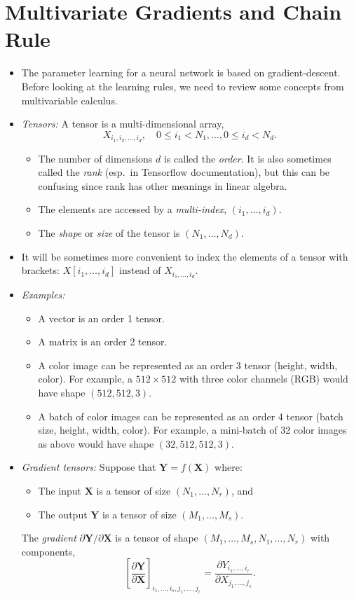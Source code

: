 \documentclass[11pt]{article}
\newcommand{\Xbf}{\mathbf{X}}
\newcommand{\Ybf}{\mathbf{Y}}
\begin{document}
\section{Multivariate Gradients and Chain Rule}

\begin{itemize}
\item The parameter learning for a neural network is based on gradient-descent.
Before looking at the learning rules, we need to review some concepts from
multivariable calculus.

\item \emph{Tensors:}  A tensor is a multi-dimensional array,
\[
    X_{i_1,i_2, \ldots, i_d}, \quad 0 \leq i_1 < N_1,\ldots,
    0 \leq i_d < N_d.
\]
\begin{itemize}
  \item The number of dimensions $d$ is called the \emph{order}.  It is also
  sometimes called the \emph{rank} (esp.\ in Tensorflow documentation), but this
  can be confusing since rank has other meanings in linear algebra.
  \item The elements are accessed by a \emph{multi-index}, $(i_1,\ldots,i_d)$.
  \item The \emph{shape} or \emph{size} of the tensor is $(N_1,\ldots,N_d)$.
\end{itemize}
\item It will be sometimes more convenient to index the elements of a tensor with brackets:
$X[i_1,\ldots,i_d]$ instead of $X_{i_1,\ldots,i_d}$.

\item \emph{Examples:}
\begin{itemize}
  \item A vector is an order 1 tensor.
  \item A matrix is an order 2 tensor.
  \item A color image can be represented as an order 3 tensor (height, width, color).
  For example, a $512 \times 512$ with three color channels (RGB) would have shape
  $(512,512,3)$.
  \item A batch of color images can be represented as an order 4 tensor 
  (batch size, height, width, color).  For example, a mini-batch of 32 color images
  as above would have shape $(32,512,512,3)$.  
\end{itemize}

\item \emph{Gradient tensors:}  Suppose that $\Ybf = f(\Xbf)$ where:
\begin{itemize}
  \item The input $\Xbf$ is a tensor of size $(N_1,\ldots,N_r)$, and
  \item The output $\Ybf$ is a tensor of size $(M_1,\ldots,M_s)$.
\end{itemize}
The \emph{gradient} $\partial \Ybf / \partial \Xbf$
is a tensor of shape $(M_1,\ldots,M_s,N_1,\ldots,N_r)$
with components,
\[
    \left[ \frac{\partial \Ybf}{\partial \Xbf} \right]_{i_1,\ldots, i_s,j_1,\ldots,j_r} = 
        \frac{\partial Y_{i_1,\ldots,i_r}}{\partial X_{j_1,\ldots,j_s}}.
\]


\end{itemize}
\end{document}
